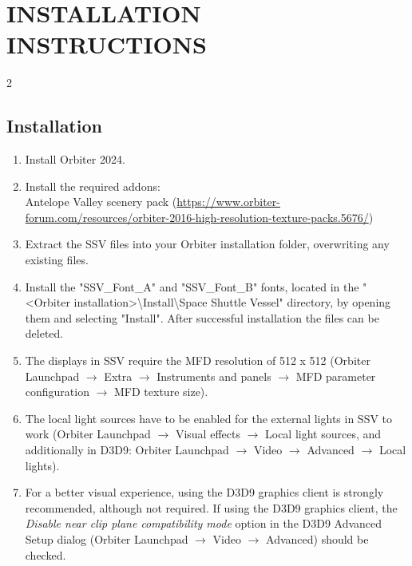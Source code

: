 \documentclass[Space_Shuttle_Vessel_Manual.tex]{subfiles}
\begin{document}
\section{INSTALLATION INSTRUCTIONS}
\begin{multicols*}{2}

\subsection{Installation}
\noindent
\begin{enumerate}
\item Install Orbiter 2024.

\item Install the required addons:\\
Antelope Valley scenery pack (\url{https://www.orbiter-forum.com/resources/orbiter-2016-high-resolution-texture-packs.5676/})

\item Extract the SSV files into your Orbiter installation folder, overwriting any existing files.\\

\item Install the "SSV\_Font\_A" and "SSV\_Font\_B" fonts, located in the "<Orbiter installation>\textbackslash Install\textbackslash Space Shuttle Vessel" directory, by opening them and selecting "Install". After successful installation the files can be deleted.

\item The displays in SSV require the MFD resolution of 512 x 512 (Orbiter Launchpad $\rightarrow$ Extra $\rightarrow$ Instruments and panels $\rightarrow$ MFD parameter configuration $\rightarrow$ MFD texture size).

\item The local light sources have to be enabled for the external lights in SSV to work (Orbiter Launchpad $\rightarrow$ Visual effects $\rightarrow$ Local light sources, and additionally in D3D9: Orbiter Launchpad $\rightarrow$ Video $\rightarrow$ Advanced $\rightarrow$ Local lights).

\item For a better visual experience, using the D3D9 graphics client is strongly recommended, although not required. If using the D3D9 graphics client, the \textit{Disable near clip plane compatibility mode} option in the D3D9 Advanced Setup dialog (Orbiter Launchpad $\rightarrow$ Video $\rightarrow$ Advanced) should be checked.\\
\end{enumerate}


\end{multicols*}
\end{document}
